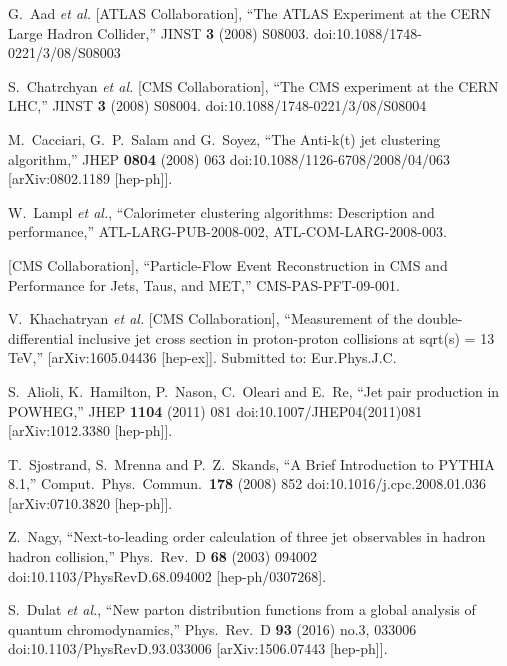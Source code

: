 \documentclass{PoS}
\begin{document}
\begin{thebibliography}{99}

  G.~Aad {\it et al.} [ATLAS Collaboration],
  ``The ATLAS Experiment at the CERN Large Hadron Collider,''
  JINST {\bf 3} (2008) S08003.
  doi:10.1088/1748-0221/3/08/S08003

  S.~Chatrchyan {\it et al.} [CMS Collaboration],
  ``The CMS experiment at the CERN LHC,''
  JINST {\bf 3} (2008) S08004.
  doi:10.1088/1748-0221/3/08/S08004

  M.~Cacciari, G.~P.~Salam and G.~Soyez,
  ``The Anti-k(t) jet clustering algorithm,''
  JHEP {\bf 0804} (2008) 063
  doi:10.1088/1126-6708/2008/04/063
  [arXiv:0802.1189 [hep-ph]].

  W.~Lampl {\it et al.}, 
   ``Calorimeter clustering algorithms: Description and performance,''
  ATL-LARG-PUB-2008-002, ATL-COM-LARG-2008-003.

  [CMS Collaboration],
  ``Particle-Flow Event Reconstruction in CMS and Performance for Jets, Taus, and MET,''
  CMS-PAS-PFT-09-001.

  V.~Khachatryan {\it et al.} [CMS Collaboration], 
   ``Measurement of the double-differential inclusive jet cross section in proton-proton collisions at sqrt(s) = 13 TeV,'' 
  [arXiv:1605.04436 [hep-ex]]. 
   Submitted to: Eur.Phys.J.C.

  S.~Alioli, K.~Hamilton, P.~Nason, C.~Oleari and E.~Re,
  ``Jet pair production in POWHEG,''
  JHEP {\bf 1104} (2011) 081
  doi:10.1007/JHEP04(2011)081
  [arXiv:1012.3380 [hep-ph]].

  T.~Sjostrand, S.~Mrenna and P.~Z.~Skands,
  ``A Brief Introduction to PYTHIA 8.1,''
  Comput.\ Phys.\ Commun.\  {\bf 178} (2008) 852
  doi:10.1016/j.cpc.2008.01.036
  [arXiv:0710.3820 [hep-ph]].

  Z.~Nagy,
  ``Next-to-leading order calculation of three jet observables in hadron hadron collision,''
  Phys.\ Rev.\ D {\bf 68} (2003) 094002
  doi:10.1103/PhysRevD.68.094002
  [hep-ph/0307268].

  S.~Dulat {\it et al.},
  ``New parton distribution functions from a global analysis of quantum chromodynamics,''
  Phys.\ Rev.\ D {\bf 93} (2016) no.3,  033006
  doi:10.1103/PhysRevD.93.033006
  [arXiv:1506.07443 [hep-ph]].


\end{thebibliography}
\end{document}
